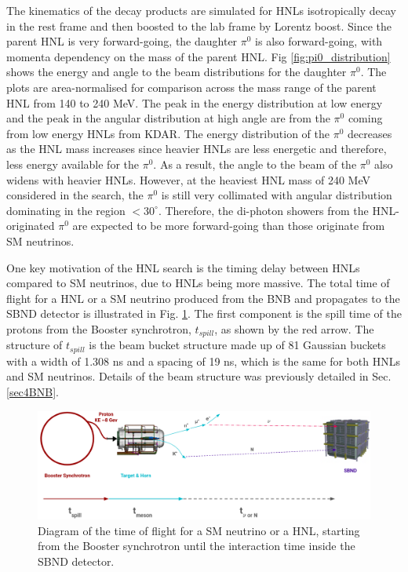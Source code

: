 The kinematics of the decay products are simulated for HNLs isotropically decay in the rest frame and then boosted to the lab frame by Lorentz boost.
Since the parent HNL is very forward-going, the daughter $\pi^0$ is also forward-going, with momenta dependency on the mass of the parent HNL. 
Fig \ref{fig:pi0_distribution} shows the energy and angle to the beam distributions for the daughter $\pi^0$.
The plots are area-normalised for comparison across the mass range of the parent HNL from 140 to 240 MeV. 
The peak in the energy distribution at low energy and the peak in the angular distribution at high angle are from the $\pi^0$ coming from low energy HNLs from KDAR.
The energy distribution of the $\pi^0$ decreases as the HNL mass increases since heavier HNLs are less energetic and therefore, less energy available for the $\pi^0$.
As a result, the angle to the beam of the $\pi^0$ also widens with heavier HNLs.
However, at the heaviest HNL mass of 240 MeV considered in the search, the $\pi^0$ is still very collimated with angular distribution dominating in the region $< 30^\circ$. 
Therefore, the di-photon showers from the HNL-originated $\pi^0$ are expected to be more forward-going than those originate from SM neutrinos.

One key motivation of the HNL search is the timing delay between HNLs compared to SM neutrinos, due to HNLs being more massive.
The total time of flight for a HNL or a SM neutrino produced from the BNB and propagates to the SBND detector is illustrated in Fig. \ref{fig:tof_beam_to_detector}.
The first component is the spill time of the protons from the Booster synchrotron, $t_{spill}$, as shown by the red arrow.
The structure of $t_{spill}$ is the beam bucket structure made up of 81 Gaussian buckets with a width of 1.308 ns and a spacing of 19 ns, which is the same for both HNLs and SM neutrinos.
Details of the beam structure was previously detailed in Sec. \ref{sec4BNB}.   

\begin{figure}[htbp!] 
\centering    
\includegraphics[width=1.0\textwidth]{tof_beam_to_detector}
\caption[tof_beam_to_detector]{
Diagram of the time of flight for a SM neutrino or a HNL, starting from the Booster synchrotron until the interaction time inside the SBND detector.
}
\label{fig:tof_beam_to_detector}
\end{figure}

